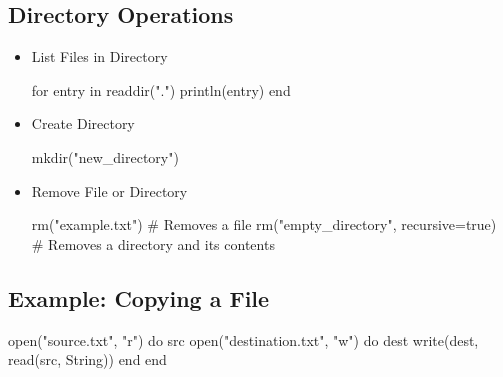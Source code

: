 \documentclass{report}
\begin{document}
     \subsection{Directory Operations}
     \bigbreak \noindent 
     \begin{itemize}
         \item List Files in Directory
             \bigbreak \noindent 
             \begin{jlcode}
                 for entry in readdir(".")
                     println(entry)
                 end
             \end{jlcode}
        \item Create Directory
            \bigbreak \noindent 
            \begin{jlcode}
            mkdir("new_directory")
            \end{jlcode}
        \item Remove File or Directory
            \bigbreak \noindent 
            \begin{jlcode}
                rm("example.txt")  # Removes a file
                rm("empty_directory", recursive=true)  # Removes a directory and its contents
            \end{jlcode}
     \end{itemize}

     \bigbreak \noindent 
     \subsection{Example: Copying a File }
     \bigbreak \noindent 
     \begin{jlcode}
         open("source.txt", "r") do src
             open("destination.txt", "w") do dest
                 write(dest, read(src, String))
             end
         end
     \end{jlcode}

     \pagebreak 
     \bigbreak \noindent 
\end{document}
